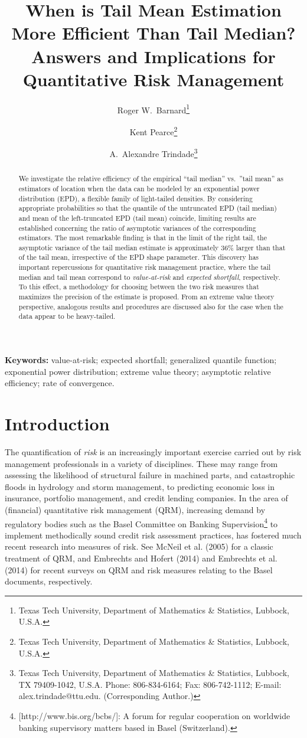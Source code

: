 \documentclass[11pt]{article}
\title{When is Tail Mean Estimation More Efficient Than Tail Median? Answers and Implications for Quantitative
 Risk Management}
\author{Roger W.~Barnard\thanks{Texas Tech University, Department of Mathematics \&
Statistics, Lubbock, U.S.A.} \and Kent Pearce\thanks{Texas Tech University, Department of Mathematics \&
Statistics, Lubbock, U.S.A.} \and A.~Alexandre
  Trindade\thanks{Texas Tech University, Department of Mathematics \&
Statistics, Lubbock, TX 79409-1042, U.S.A. Phone: 806-834-6164; Fax: 806-742-1112;
E-mail: alex.trindade@ttu.edu. (Corresponding Author.)}}
\newcommand{\etal}{et al.}
\newcommand{\nc}{\normalcolor}
\begin{document}
\maketitle
\begin{abstract}
We investigate the relative efficiency of the empirical
``tail median'' vs.~''tail mean'' as estimators of location when the
data can be modeled by an
exponential power distribution (EPD), a flexible family of
light-tailed densities. By considering appropriate probabilities so
that the quantile of the untruncated EPD (tail median) and
mean of the left-truncated EPD (tail mean) coincide, limiting results are established
concerning the ratio of asymptotic variances of the corresponding
estimators.  The most remarkable finding is that in
the limit of the right tail, the asymptotic variance of the tail
median estimate is approximately 36\% larger
than that of the tail mean, irrespective of the EPD shape
parameter. This discovery has important repercussions for quantitative
 risk management practice, where the tail median and tail mean
correspond to \emph{value-at-risk} and \emph{expected shortfall}, respectively. 
To this effect, a methodology for choosing between the two risk
measures that maximizes the precision of the estimate is
proposed. From an extreme value theory perspective, analogous results
and procedures are
discussed also for the case when the data appear to be heavy-tailed.
\end{abstract}
\nc

\noindent\textbf{Keywords:} value-at-risk; expected shortfall; generalized quantile function;
exponential power distribution; extreme value theory; asymptotic relative efficiency; rate of convergence.


\section{Introduction}
The quantification of \emph{risk} is an increasingly important exercise
carried out by
risk management professionals in a variety of
disciplines. These may range from assessing
the likelihood of structural failure in machined parts, and catastrophic
floods in hydrology and storm management, to predicting economic loss in insurance,
portfolio management, and credit lending companies. In the area of
(financial) quantitative
 risk management (QRM), increasing demand by regulatory bodies such as the Basel
Committee on Banking Supervision\footnote{[http://www.bis.org/bcbs/]: A forum for regular
  cooperation on worldwide banking supervisory matters based in Basel (Switzerland).} to
implement methodically sound credit risk assessment practices, has fostered much recent research
into measures of risk. See McNeil \etal{} (2005) for a classic
treatment of QRM, and Embrechts and Hofert (2014) and Embrechts \etal{} (2014) for recent surveys
on QRM and risk measures relating
to the Basel documents, respectively. 
\end{document}
